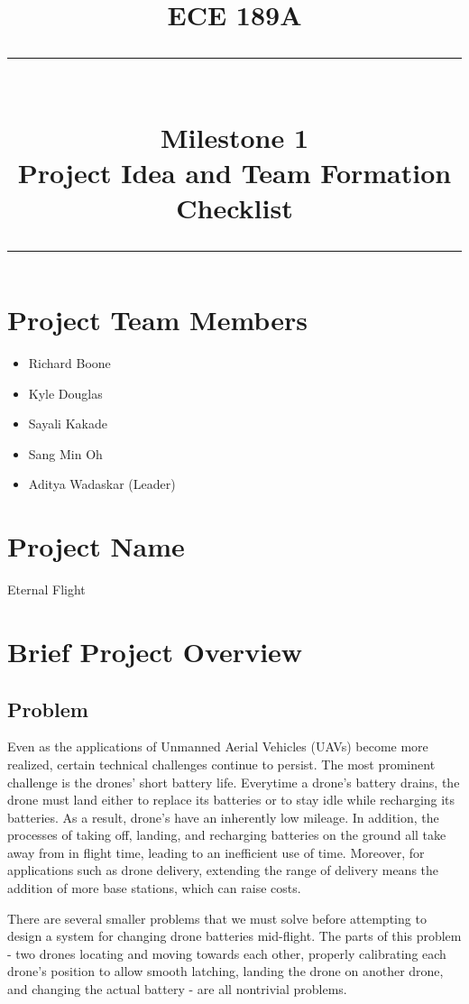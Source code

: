 \documentclass[paper=a4, fontsize=12pt]{scrartcl}
\title{
		\vspace{-0.5in} 	
		\usefont{OT1}{bch}{b}{n}
		\normalfont \normalsize \textsc{ECE 189A} \\ [10pt]
		\rule{\linewidth}{2pt} \\ [0.4cm]
		\huge Milestone 1 \\
		\Large Project Idea and Team Formation Checklist
		\rule{\linewidth}{2pt}
}
\author{
}
\date{}
\begin{document}
\maketitle


\vspace{-1in}
\section{Project Team Members}
\begin{itemize}
	\item Richard Boone
	\item Kyle Douglas
	\item Sayali Kakade
	\item Sang Min Oh
	\item Aditya Wadaskar (Leader)
\end{itemize}

\section{Project Name}
Eternal Flight

\section{Brief Project Overview}
\subsection{Problem}
Even as the applications of Unmanned Aerial Vehicles (UAVs) become more realized, certain technical challenges continue to persist. 
The most prominent challenge is the drones' short battery life. 
Everytime a drone's battery drains, the drone must land either to replace its batteries or to stay idle while recharging its batteries. 
As a result, drone's have an inherently low mileage. 
In addition, the processes of taking off, landing, and recharging batteries on the ground all take away from in flight time, leading to an inefficient use of time.
Moreover, for applications such as drone delivery, extending the range of delivery means the addition of more base stations, which can raise costs.

There are several smaller problems that we must solve before attempting to design a system for changing drone batteries mid-flight.
The parts of this problem - two drones locating and moving towards each other, properly calibrating each drone's position to allow smooth latching, landing the drone on another drone, and changing the actual battery - are all nontrivial problems. 
\end{document}
